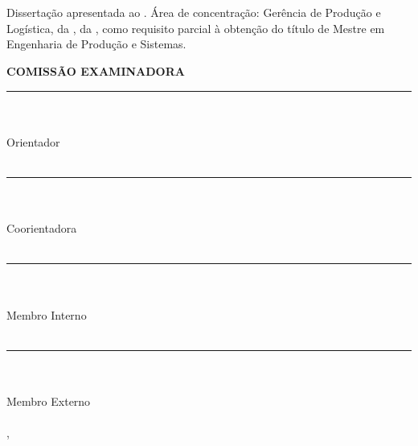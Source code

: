 \begin{center}
    {\MakeUppercase{\textbf{\aluno}} \\ [1cm]

    \MakeUppercase{\textbf{\titulo}} \\ [1cm]

    \hspace{.45\textwidth} %
        \begin{minipage}{.5\textwidth}
        \noindent Dissertação apresentada ao \curso. Área de concentração: Gerência de Produção e Logística, da \departamento, da \universidade, como requisito parcial à obtenção do título de Mestre em Engenharia de Produção e Sistemas. \\ [5mm]
        \end{minipage}
    \textbf{COMISSÃO EXAMINADORA} \\ [5mm]
    
    \rule{5cm}{.1mm} \\ \orientador \\ Orientador\\ \universidade \\ [5mm]

    \rule{5cm}{.1mm} \\ \coorientador \\ Coorientadora \\ \universidade \\ [5mm]

    \rule{5cm}{.1mm} \\ \convidadoa \\ Membro Interno \\ \univconvidadoa \\ [5mm]
    
    \rule{5cm}{.1mm} \\ \convidadob \\ Membro Externo \\ \univconvidadob \\ [5mm]
    

  
    
    \cidade, \datadefesa
    }
\end{center}
